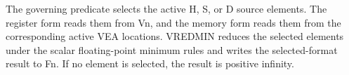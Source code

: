 The governing predicate selects the active H, S, or D source elements.
The register form reads them from Vn, and the memory form reads them from the
corresponding active VEA locations. VREDMIN reduces the selected elements
under the scalar floating-point minimum rules and writes the selected-format
result to Fn. If no element is selected, the result is positive infinity.
